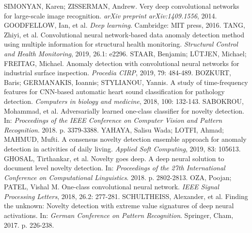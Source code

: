 \documentclass[11pt,twoside,openright]{report}
\begin{document}
\begin{thebibliography}{L}
SIMONYAN, Karen; ZISSERMAN, Andrew. Very deep convolutional networks for large-scale image recognition. \textit{arXiv preprint arXiv:1409.1556}, 2014.
GOODFELLOW, Ian, et al. \textit{Deep learning}. Cambridge: MIT press, 2016.
TANG, Zhiyi, et al. Convolutional neural network‐based data anomaly detection method using multiple information for structural health monitoring. \textit{Structural Control and Health Monitoring}, 2019, 26.1: e2296.
STAAR, Benjamin; LÜTJEN, Michael; FREITAG, Michael. Anomaly detection with convolutional neural networks for industrial surface inspection. \textit{Procedia CIRP}, 2019, 79: 484-489.
BOZKURT, Baris; GERMANAKIS, Ioannis; STYLIANOU, Yannis. A study of time-frequency features for CNN-based automatic heart sound classification for pathology detection. \textit{Computers in biology and medicine}, 2018, 100: 132-143.
SABOKROU, Mohammad, et al. Adversarially learned one-class classifier for novelty detection. In: \textit{Proceedings of the IEEE Conference on Computer Vision and Pattern Recognition}. 2018. p. 3379-3388.
YAHAYA, Salisu Wada; LOTFI, Ahmad; MAHMUD, Mufti. A consensus novelty detection ensemble approach for anomaly detection in activities of daily living. \textit{Applied Soft Computing}, 2019, 83: 105613.
GHOSAL, Tirthankar, et al. Novelty goes deep. A deep neural solution to document level novelty detection. In: \textit{Proceedings of the 27th International Conference on Computational Linguistics}. 2018. p. 2802-2813.
OZA, Poojan; PATEL, Vishal M. One-class convolutional neural network. \textit{IEEE Signal Processing Letters}, 2018, 26.2: 277-281.
SCHULTHEISS, Alexander, et al. Finding the unknown: Novelty detection with extreme value signatures of deep neural activations. In: \textit{German Conference on Pattern Recognition}. Springer, Cham, 2017. p. 226-238.


\end{thebibliography}
\end{document}

